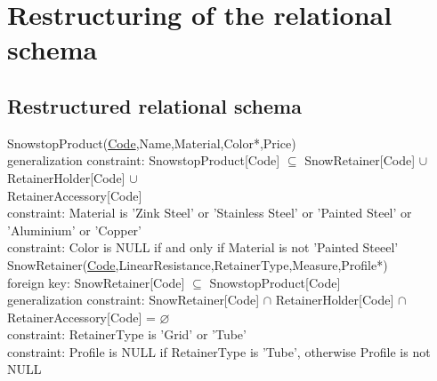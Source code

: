 
\section{Restructuring of the relational schema}

\subsection{Restructured relational schema}

\vspace{12px}

{\color{ForestGreen}SnowstopProduct(\underline{Code},Name,Material,Color*,Price)}\\
{\color{Orange}\hspace{2mm} generalization constraint: {\color{Magenta} SnowstopProduct[Code] $\subseteq $ SnowRetainer[Code] $\cup$ RetainerHolder[Code] $\cup$ }} \\
{{\color{Magenta}\hspace{39mm} RetainerAccessory[Code] }} \\
{\color{Orange}\hspace{2mm} constraint: {\color{Magenta}Material is 'Zink Steel' or 'Stainless Steel' or 'Painted Steel' or 'Aluminium' or 'Copper'}} \\
{\color{Orange}\hspace{2mm} constraint: {\color{Magenta}Color is NULL if and only if Material is not 'Painted Steeel'}} \\

{\color{ForestGreen}SnowRetainer(\underline{Code},LinearResistance,RetainerType,Measure,Profile*)}\\
{\color{Orange}\hspace{2mm} foreign key: {\color{Magenta}SnowRetainer[Code] $\subseteq$ SnowstopProduct[Code]}} \\
{\color{Orange}\hspace{2mm} generalization constraint: {\color{Magenta} SnowRetainer[Code] $\cap $ RetainerHolder[Code] $\cap$ RetainerAccessory[Code] = $\varnothing $}} \\
{\color{Orange}\hspace{2mm} constraint: {\color{Magenta}RetainerType is 'Grid' or 'Tube'}} \\
{\color{Orange}\hspace{2mm} constraint: {\color{Magenta}Profile is NULL if RetainerType is 'Tube', otherwise Profile is not NULL}} \\

